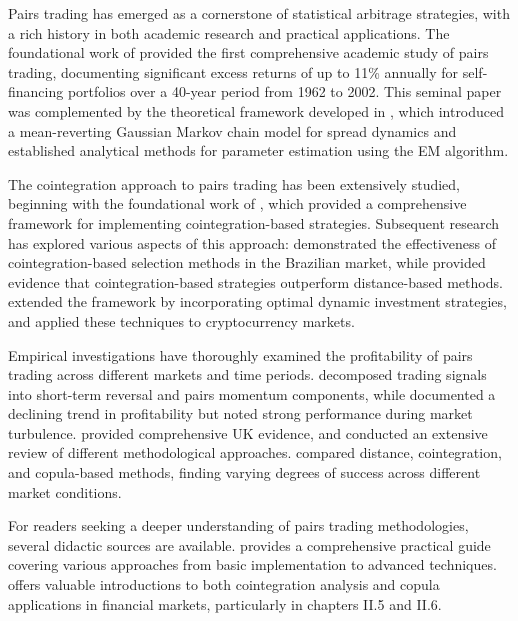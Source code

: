 
Pairs trading has emerged as a cornerstone of statistical arbitrage strategies, with a rich history in both academic research and practical applications. The foundational work of \cite{Gatev2006} provided the first comprehensive academic study of pairs trading, documenting significant excess returns of up to 11\% annually for self-financing portfolios over a 40-year period from 1962 to 2002. This seminal paper was complemented by the theoretical framework developed in \cite{Elliott2005}, which introduced a mean-reverting Gaussian Markov chain model for spread dynamics and established analytical methods for parameter estimation using the EM algorithm.

The cointegration approach to pairs trading has been extensively studied, beginning with the foundational work of \cite{vidyamurthy2004pairs}, which provided a comprehensive framework for implementing cointegration-based strategies. Subsequent research has explored various aspects of this approach: \cite{Caldeira2013} demonstrated the effectiveness of cointegration-based selection methods in the Brazilian market, while \cite{Huck2014} provided evidence that cointegration-based strategies outperform distance-based methods. \cite{Cartea2015} extended the framework by incorporating optimal dynamic investment strategies, and \cite{Lintilhac2016} applied these techniques to cryptocurrency markets.

Empirical investigations have thoroughly examined the profitability of pairs trading across different markets and time periods. \cite{Chen2019} decomposed trading signals into short-term reversal and pairs momentum components, while \cite{Do2010} documented a declining trend in profitability but noted strong performance during market turbulence. \cite{Bowen2014} provided comprehensive UK evidence, and \cite{Krauss2016} conducted an extensive review of different methodological approaches. \cite{Rad2016} compared distance, cointegration, and copula-based methods, finding varying degrees of success across different market conditions.

For readers seeking a deeper understanding of pairs trading methodologies, several didactic sources are available. \cite{hudsonthames2024} provides a comprehensive practical guide covering various approaches from basic implementation to advanced techniques. \cite{alexander2008market} offers valuable introductions to both cointegration analysis and copula applications in financial markets, particularly in chapters II.5 and II.6.

